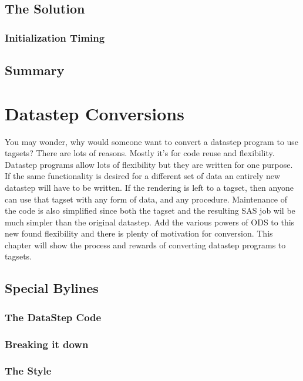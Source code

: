 \documentclass{book}
\begin{document}
\section{The Solution}

\subsection{Initialization Timing}

\section{Summary}

\chapter{Datastep Conversions}
You may wonder, why would someone want to convert a datastep 
program to use tagsets?  There are lots of reasons.  Mostly it's
for code reuse and flexibility.  Datastep programs allow lots of
flexibility but they are written for one purpose.  If the same 
functionality is desired for a different set of data an entirely
new datastep will have to be written.  If the rendering is left to
a tagset, then anyone can use that tagset with any form of data,
and any procedure.  Maintenance of the code is also simplified 
since both the tagset and the resulting SAS job wil be much
simpler than the original datastep. Add the various powers of
ODS to this new found flexibility and there is plenty of motivation
for conversion.  This chapter will show the process and rewards 
of converting datastep programs to tagsets. 
\section{Special Bylines}

\subsection{The DataStep Code}

\subsection{Breaking it down}

\subsection{The Style}
\end{document}
